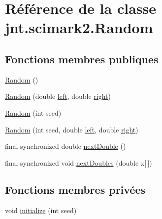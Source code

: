 \hypertarget{classjnt_1_1scimark2_1_1Random}{\section{Référence de la classe jnt.\-scimark2.\-Random}
\label{classjnt_1_1scimark2_1_1Random}
}
\subsection*{Fonctions membres publiques}
\begin{DoxyCompactItemize}
\item 
\hyperlink{classjnt_1_1scimark2_1_1Random_a3237e048e925076fefd7bec1c917e23e}{Random} ()
\item 
\hyperlink{classjnt_1_1scimark2_1_1Random_a11ce62c68016e6c84a9a70c63d3b3e4e}{Random} (double \hyperlink{classjnt_1_1scimark2_1_1Random_a3d63c681768d9fba34385c730b12de22}{left}, double \hyperlink{classjnt_1_1scimark2_1_1Random_a61abe62a2fb5de3294a2c231268bf893}{right})
\item 
\hyperlink{classjnt_1_1scimark2_1_1Random_ac13652259c67fcce72584f6b33fb88fc}{Random} (int seed)
\item 
\hyperlink{classjnt_1_1scimark2_1_1Random_a8f47099be80eae7ea808223f1fb75aa3}{Random} (int seed, double \hyperlink{classjnt_1_1scimark2_1_1Random_a3d63c681768d9fba34385c730b12de22}{left}, double \hyperlink{classjnt_1_1scimark2_1_1Random_a61abe62a2fb5de3294a2c231268bf893}{right})
\item 
final synchronized double \hyperlink{classjnt_1_1scimark2_1_1Random_a1a5cee3b6d5631f9922d89f96725cc9a}{next\-Double} ()
\item 
final synchronized void \hyperlink{classjnt_1_1scimark2_1_1Random_a61a639bf274d04604fcd78690e3b6eb0}{next\-Doubles} (double x\mbox{[}$\,$\mbox{]})
\end{DoxyCompactItemize}
\subsection*{Fonctions membres privées}
\begin{DoxyCompactItemize}
\item 
void \hyperlink{classjnt_1_1scimark2_1_1Random_ac62411f14367d260c01939f726f79630}{initialize} (int seed)
\end{DoxyCompactItemize}
